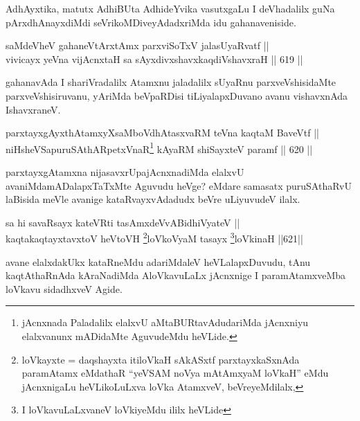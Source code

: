 \begin{artha}
AdhAyxtika, matutx AdhiBUta AdhideYvika vasutxgaLu I deVhadalilx guNa pArxdhAnayxdiMdi seVrikoMDiveyAdadxriMda idu gahanaveniside.
\end{artha}


\begin{shl}
saMdeVheV gahaneV\s tArx\s \s tAmx parxviSoTxV jalasUyaRvatf || \\
vivicayx yeVna vijAcnxtaH sa sAyxdivxshavxkaqdiVshavxraH \hfill || 619 ||  
\end{shl}

\begin{artha}
gahanavAda I shariVradalilx Atamxnu jaladalilx sUyaRnu parxveVshisidaMte parxveVshisiruvanu, yAriMda beVpaRDisi tiLiyalapxDuvano avanu vishavxnAda IshavxraneV.
\end{artha}


\begin{shl}
parxtayxgAyxthAtamxyXsaMboVdhAtasxvaRM teVna kaqtaM BaveVtf || \\
niHsheVSapuruSAthARpetxVnaR\footnote{jAcnxnada Paladalilx elalxvU aMtaBURtavAdudariMda jAcnxniyu elalxvanunx mADidaMte AguvudeMdu heVLide.} kAyaRM shiSayxteV paramf \hfill || 620 ||  
\end{shl}


\begin{artha}
parxtayxgAtamxna nijasavxrUpajAcnxnadiMda elalxvU avaniMda\break mADalapxTaTxMte Aguvudu heVge? eMdare samasatx puruSAthaRvU laBisida meVle avanige kataRvayxvAdadudx beVre uLiyuvudeV ilalx.
\end{artha}


\begin{shl}
sa hi savaRsayx kateVRti tasAmxdeVvABidhiVyateV || \\
kaqtakaqtayxtavxtoV heVtoVH \footnote{loVkayxte = daqshayxta itiloVkaH sAkASxtf parxtayxkaSxnAda paramAtamx eMdathaR ``yeVSAM noV\s ya mAtAmxyaM loVkaH'' eMdu jAcnxnigaLu heVLikoLuLxva loVka AtamxveV, beVreyeMdilalx,}loVkoV\s yaM tasayx \footnote{I loVkavuLaLxvaneV loVkiyeMdu ililx heVLide}loVkinaH \hfill ||621||  
\end{shl}

\begin{artha}
avane elalxdakUkx kataRneMdu adariMdaleV heVLalapxDuvudu, tAnu
kaqtAthaRnAda kAraNadiMda AloVkavuLaLx jAcnxnige I paramAtamxveMba
loVkavu sidadhxveV Agide.
\end{artha}

